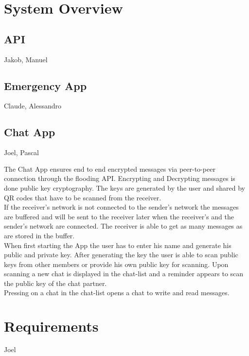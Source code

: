 \documentclass{report}
\newcommand{\rfig}[1]{Figure~\ref{fig:#1}}
\begin{document}
	\section{System Overview}
		\subsection{API}
		Jakob, Manuel
		
		\subsection{Emergency App}
		Claude, Alessandro
		
		\subsection{Chat App}
		Joel, Pascal
			
			The Chat App ensures end to end encrypted messages via peer-to-peer connection through the flooding API. Encrypting and Decrypting messages is done public key cryptography. The keys are generated by the user and shared by QR codes that have to be scanned from the receiver.\\
			If the receiver's network is not connected to the sender's network the messages are buffered and will be sent to the receiver later when the receiver's and the sender's network are connected. The receiver is able to get as many messages as are stored in the buffer.\\
			
			When first starting the App the user has to enter his name and generate his public and private key. After generating the key the user is able to scan public keys from other members or provide his own public key for scanning. Upon scanning a new chat is displayed in the chat-list and a reminder appears to scan the public key of the chat partner. \\
			
			Pressing on a chat in the chat-list opens a chat to write and read messages.\\
			
	
	\section{Requirements}
		Joel
	
\end{document}
